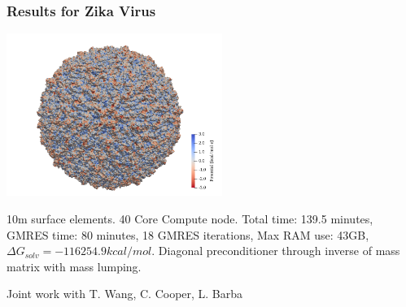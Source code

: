 \documentclass[dvipsnames,10pt]{beamer}
\begin{document}
\begin{frame}
	\frametitle{Results for Zika Virus}
	
	\begin{center}
		\includegraphics[width=7cm]{../figs/6CO8_potential.png}
	\end{center}
	
	10m surface elements. 40 Core Compute node. Total time: 139.5 minutes, GMRES time: 80 minutes, 18 GMRES iterations, Max RAM use: 43GB, $\Delta G_{solv} = -116254.9 kcal/mol$. Diagonal preconditioner through inverse of mass matrix with mass lumping.
	
	\vspace{\baselineskip}
	
	\begin{small}
		Joint work with T. Wang, C. Cooper, L. Barba
	\end{small}
	
\end{frame}
\end{document}
